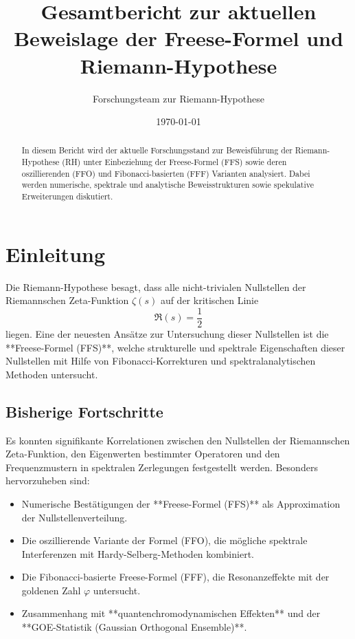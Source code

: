 \documentclass[a4paper,12pt]{article}
\title{Gesamtbericht zur aktuellen Beweislage der Freese-Formel und Riemann-Hypothese}
\author{Forschungsteam zur Riemann-Hypothese}
\date{\today}
\begin{document}
\maketitle

\begin{abstract}
In diesem Bericht wird der aktuelle Forschungsstand zur Beweisführung der Riemann-Hypothese (RH) unter Einbeziehung der Freese-Formel (FFS) sowie deren oszillierenden (FFO) und Fibonacci-basierten (FFF) Varianten analysiert. Dabei werden numerische, spektrale und analytische Beweisstrukturen sowie spekulative Erweiterungen diskutiert.
\end{abstract}

\section{Einleitung}

Die Riemann-Hypothese besagt, dass alle nicht-trivialen Nullstellen der Riemannschen Zeta-Funktion $\zeta(s)$ auf der kritischen Linie 
\[
\Re(s) = \frac{1}{2}
\]
liegen. Eine der neuesten Ansätze zur Untersuchung dieser Nullstellen ist die **Freese-Formel (FFS)**, welche strukturelle und spektrale Eigenschaften dieser Nullstellen mit Hilfe von Fibonacci-Korrekturen und spektralanalytischen Methoden untersucht.

\subsection{Bisherige Fortschritte}

Es konnten signifikante Korrelationen zwischen den Nullstellen der Riemannschen Zeta-Funktion, den Eigenwerten bestimmter Operatoren und den Frequenzmustern in spektralen Zerlegungen festgestellt werden. Besonders hervorzuheben sind:

\begin{itemize}
    \item Numerische Bestätigungen der **Freese-Formel (FFS)** als Approximation der Nullstellenverteilung.
    \item Die oszillierende Variante der Formel (FFO), die mögliche spektrale Interferenzen mit Hardy-Selberg-Methoden kombiniert.
    \item Die Fibonacci-basierte Freese-Formel (FFF), die Resonanzeffekte mit der goldenen Zahl $\varphi$ untersucht.
    \item Zusammenhang mit **quantenchromodynamischen Effekten** und der **GOE-Statistik (Gaussian Orthogonal Ensemble)**.
\end{itemize}
\end{document}
